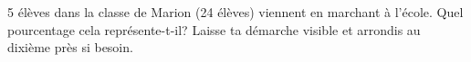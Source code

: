 %
%
	5 élèves dans la classe de Marion (24 élèves) viennent en marchant à l'école. Quel pourcentage cela représente-t-il? Laisse ta démarche visible et arrondis au dixième près si besoin.

